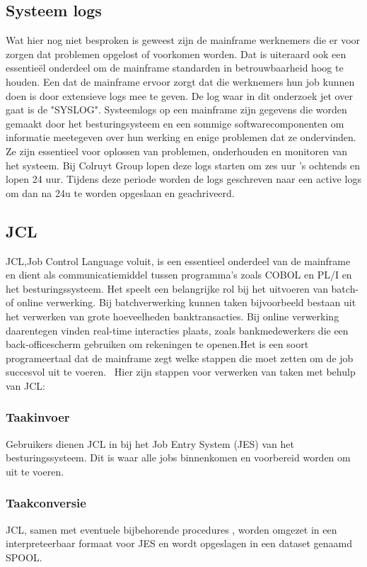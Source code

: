\subsection{Systeem logs}
 Wat hier nog niet besproken is geweest zijn de mainframe werknemers die er voor zorgen dat problemen opgelost of voorkomen worden. Dat is uiteraard ook een essentieël onderdeel om de mainframe standarden in betrouwbaarheid hoog te houden. Een dat de mainframe ervoor zorgt dat die werknemers hun job kunnen doen is door extensieve logs mee te geven. De log waar in dit onderzoek jet over gaat is de "SYSLOG". Systeemlogs op een mainframe zijn gegevens die worden gemaakt door het besturingsysteem en een sommige softwarecomponenten om informatie meetegeven over hun werking en enige problemen dat ze ondervinden. Ze zijn essentieel voor oplossen van problemen, onderhouden en monitoren van het systeem. Bij Colruyt Group lopen deze logs starten om zes uur 's ochtends en lopen 24 uur. Tijdens deze periode worden de logs geschreven naar een active logs om dan na 24u te worden opgeslaan en geachriveerd.
 
\subsection{JCL}
JCL,Job Control Language voluit, is een essentieel onderdeel van de mainframe en dient als communicatiemiddel tussen programma's zoals COBOL en PL/I en het besturingssysteem. Het speelt een belangrijke rol bij het uitvoeren van batch- of online verwerking. Bij batchverwerking kunnen taken bijvoorbeeld bestaan uit het verwerken van grote hoeveelheden banktransacties. Bij online verwerking daarentegen vinden real-time interacties plaats, zoals bankmedewerkers die een back-officescherm gebruiken om rekeningen te openen.Het is een soort programeertaal dat de mainframe zegt welke stappen die moet zetten om de job succesvol uit te voeren.~\autocite{tutpoint} Hier zijn stappen voor verwerken van taken met behulp van JCL:

\subsubsection{Taakinvoer}
Gebruikers dienen JCL in bij het Job Entry System (JES) van het besturingssysteem. Dit is waar alle jobs binnenkomen en voorbereid worden om uit te voeren.

\subsubsection{Taakconversie}
JCL, samen met eventuele bijbehorende procedures , worden omgezet in een interpreteerbaar formaat voor JES en wordt opgeslagen in een dataset genaamd SPOOL.

